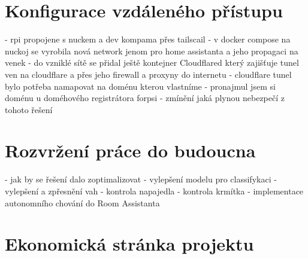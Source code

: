 \newpage
\section{Konfigurace vzdáleného přístupu}\label{sec:konfigurace-vzdaleneho-pristupu}
- rpi propojene s nuckem a dev kompama přes tailscail\newline
- v docker compose na nuckoj se vyrobila nová network jenom pro home assistanta a jeho propagaci na venek\newline
- do vzniklé sítě se přidal ještě kontejner Cloudflared který zajišťuje tunel ven na cloudflare a přes jeho firewall a proxyny do internetu\newline
- cloudflare tunel bylo potřeba namapovat na doménu kterou vlastníme\newline
- pronajmul jsem si doménu u doméhového registrátora forpsi\newline
- zmínění jaká plynou nebezpečí z tohoto řešení

\newpage
\section{Rozvržení práce do budoucna}\label{sec:rozvrzeni-prace-do-budoucna}
- jak by se řešení dalo zoptimalizovat\newline
- vylepšení modelu pro classifykaci\newline
- vylepšení a zpřesnění vah\newline
- kontrola napajedla\newline
- kontrola krmítka
- implementace autonomního chování do Room Assistanta

\newpage
\section{Ekonomická stránka projektu}\label{sec:ekonomicka-stranka-projektu}

